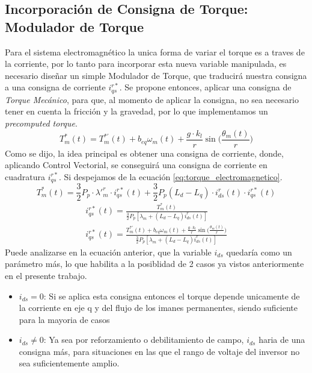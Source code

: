 \documentclass[12pt, a4paper,journal, onecolumn, compsoc]{IEEEtran}
\begin{document}
\subsection{Incorporación de Consigna de Torque: Modulador de Torque}
Para el sistema electromagnético la unica forma de variar el torque es a traves de la corriente, por lo tanto para incorporar esta nueva variable manipulada, es necesario diseñar un simple Modulador de Torque, que traducirá nuestra consigna a una consigna de corriente $i_{qs}^{r*}$. Se propone entonces, aplicar una consigna de \textit{Torque Mecánico}, para que, al momento de aplicar la consigna, no sea necesario tener en cuenta la fricción y la gravedad, por lo que implementamos un \textit{precomputed torque}.
\begin{equation}
    T_m^{\ast}(t) = T_m^{\ast\prime}(t) + b_{eq}\omega_m(t) + \frac{g\cdot k_l}{r}\sin{\Bigg( \frac{\theta_m(t)}{r}\Bigg)}
\end{equation}
Como se dijo, la idea principal es obtener una consigna de corriente, donde, aplicando Control Vectorial, se conseguirá una consigna de corriente en cuadratura $i_{qs}^{r*}$. Si despejamos de la ecuación \eqref{eq:torque_electromagnetico}.
    \begin{equation*}
            T_m^*(t) = \frac{3}{2} P_p \cdot \lambda'^r_m \cdot i^{r*}_{qs}(t) + \frac{3}{2} P_p (L_d-L_q)\cdot i^r_{ds}(t)\cdot i^{r*}_{qs}(t)
    \end{equation*}
\begin{gather*}
i_{qs}^{r*}(t)=
\frac{T_m^*(t)}
{\frac{3}{2}P_p\left[\lambda_m+(L_d-L_q)i_{ds}^{r}(t)\right]} \\
i_{qs}^{r*}(t)= \frac{T_m^{\ast\prime}(t) + b_{eq}\omega_m(t) + \frac{g\cdot k_l}{r}\sin{\Big( \frac{\theta_m(t)}{r}\Big)}}{\frac{3}{2}P_p\left[\lambda_m+(L_d-L_q)i_{ds}^{r}(t)\right]}
\end{gather*}
Puede analizarse en la ecuación anterior, que la variable $i_{ds}$ quedaría como un parámetro más, lo que habilita a la posiblidad de 2 casos ya vistos anteriormente en el presente trabajo.
\begin{itemize}
    \item $i_{ds} = 0$: Si se aplica esta consigna entonces el torque depende unicamente de la corriente en eje q y del flujo de los imanes permanentes, siendo suficiente para la mayoria de casos
    \item $i_{ds} \neq 0$: Ya sea por reforzamiento o debilitamiento de campo, $i_{ds}$ haria de una consigna más, para situaciones en las que el rango de voltaje del inversor no sea suficientemente amplio.
\end{itemize}
\end{document}
